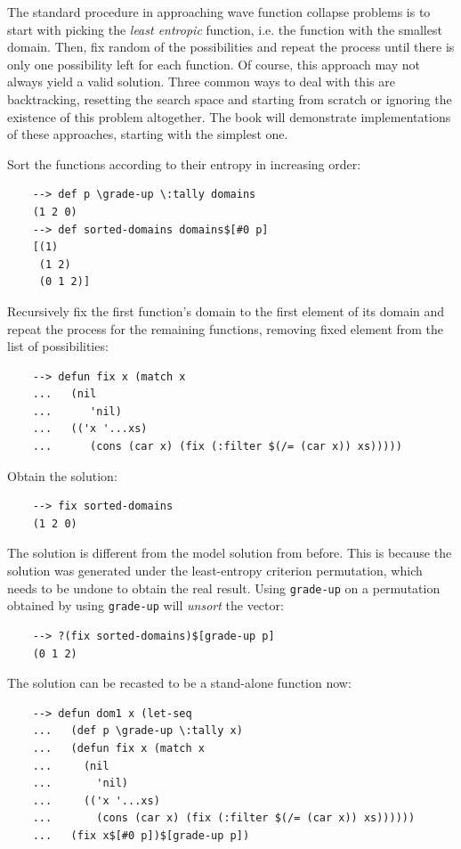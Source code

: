 The standard procedure in approaching wave function collapse problems is to start with picking the \textit{least entropic} function, i.e. the function with the smallest domain. Then, fix random of the possibilities and repeat the process until there is only one possibility left for each function. Of course, this approach may not always yield a valid solution. Three common ways to deal with this are backtracking, resetting the search space and starting from scratch or ignoring the existence of this problem altogether. The book will demonstrate implementations of these approaches, starting with the simplest one.

Sort the functions according to their entropy in increasing order:

\begin{Verbatim}
    --> def p \grade-up \:tally domains
    (1 2 0)
    --> def sorted-domains domains$[#0 p]
    [(1)
     (1 2)
     (0 1 2)]
\end{Verbatim}

Recursively fix the first function's domain to the first element of its domain and repeat the process for the remaining functions, removing fixed element from the list of possibilities:

\begin{Verbatim}
    --> defun fix x (match x
    ...   (nil
    ...      'nil)
    ...   (('x '...xs)
    ...      (cons (car x) (fix (:filter $(/= (car x)) xs)))))
\end{Verbatim}

Obtain the solution:

\begin{Verbatim}
    --> fix sorted-domains
    (1 2 0)
\end{Verbatim}

The solution is different from the model solution from before. This is because the solution was generated under the least-entropy criterion permutation, which needs to be undone to obtain the real result. Using \verb|grade-up| on a permutation obtained by using \verb|grade-up| will \textit{unsort} the vector:

\begin{Verbatim}
    --> ?(fix sorted-domains)$[grade-up p]
    (0 1 2)
\end{Verbatim}

The solution can be recasted to be a stand-alone function now:

\begin{Verbatim}
    --> defun dom1 x (let-seq
    ...   (def p \grade-up \:tally x)
    ...   (defun fix x (match x
    ...     (nil
    ...       'nil)
    ...     (('x '...xs)
    ...       (cons (car x) (fix (:filter $(/= (car x)) xs))))))
    ...   (fix x$[#0 p])$[grade-up p])
\end{Verbatim}

